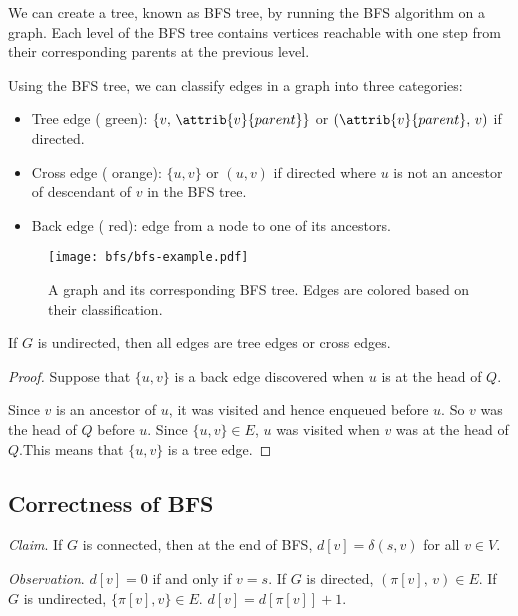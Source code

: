 We can create a tree, known as BFS tree, by running the BFS algorithm on a graph. Each level of the BFS tree contains vertices reachable with one step from their corresponding parents at the previous level.

Using the BFS tree, we can classify edges in a graph into three categories:

\begin{itemize}   
    \item Tree edge ({\color{seagreen} green}): $\{v,\, \attrib{v}{parent}\}$ or $(\attrib{v}{parent},\, v)$ if directed.
    \item Cross edge ({\color{orange} orange}): $\{ u,v \}$ or $(u,v)$ if directed where $u$ is not an ancestor of descendant of $v$ in the BFS tree.
    \item Back edge ({\color{red} red}): edge from a node to one of its ancestors.
\end{itemize}

\begin{figure}[htbp]
    \centering
    \texttt{[image: bfs/bfs-example.pdf]}
    \caption{A graph and its corresponding BFS tree. Edges are colored based on their classification.}
    \label{fig:bfs-example}
\end{figure}

\begin{lemma}
    If $G$ is undirected, then all edges are tree edges or cross edges.
\end{lemma}

\begin{proof}
    Suppose that $\{u,v\}$ is a back edge discovered when $u$ is at the head of $Q$.

    Since $v$ is an ancestor of $u$, it was visited and hence enqueued before $u$. So $v$ was the head of $Q$ before $u$. Since $\{u,v\} \in E$, $u$ was visited when $v$ was at the head of $Q$.This means that $\{u,v\}$ is a tree edge.
\end{proof}

\subsection{Correctness of BFS}

\textit{Claim}. If $G$ is connected, then at the end of BFS, $d[v] = \delta(s,v)$ for all $v \in V$.

\textit{Observation}. $d[v]=0$ if and only if $v=s$. If $G$ is directed, $(\pi[v],\, v) \in E$. If $G$ is undirected, $\{ \pi[v], v \} \in E$. $d[v] = d[\pi[v]]+1$.


